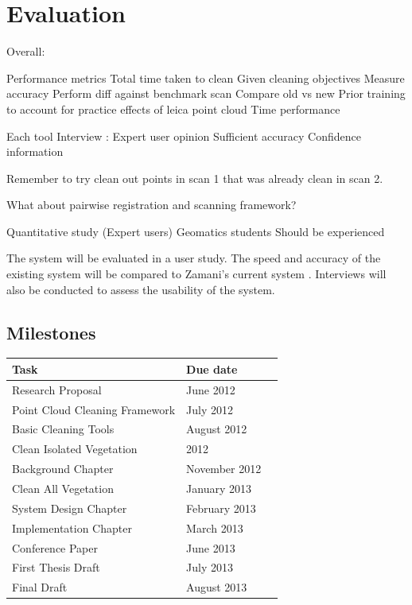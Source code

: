 \documentclass[10pt,twocolumn]{article}
\begin{document}
\section{Evaluation}

Overall:

Performance metrics
	Total time taken to clean
		Given cleaning objectives
		Measure accuracy
			Perform diff against benchmark scan
		Compare old vs new
		Prior training to account for practice effects of leica point cloud
	Time performance
		
Each tool
	Interview : Expert user opinion
		Sufficient accuracy
		Confidence information
			
Remember to try clean out points in scan 1 that was already clean in scan 2.

What about pairwise registration and scanning framework?


Quantitative study (Expert users)
	Geomatics students
	Should be experienced

The system will be evaluated in a user study. The speed and accuracy of the existing system will be compared to Zamani's current system \cite{Leica2012}. Interviews will also be conducted to assess the usability of the system.

\subsection{Milestones}
\begin{tabular}{llr}
\hline
Task & Due date \\
\hline
Research Proposal & June 2012\\
Point Cloud Cleaning Framework & July 2012\\
Basic Cleaning Tools & August 2012\\
Clean Isolated Vegetation &  2012\\
Background Chapter & November 2012\\
Clean All Vegetation & January 2013\\
System Design Chapter & February 2013\\
Implementation Chapter & March 2013\\
Conference Paper & June 2013\\
First Thesis Draft & July 2013\\
Final Draft & August 2013\\
\hline
\end{tabular}




\end{document}
